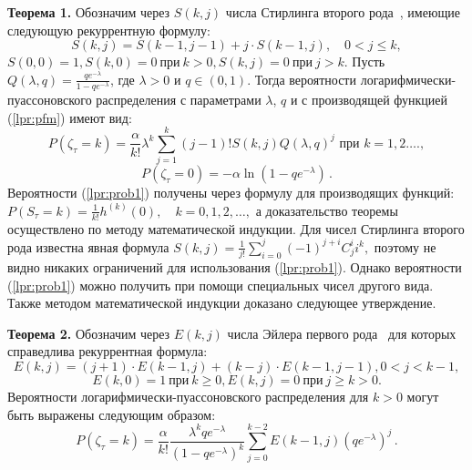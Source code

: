 \documentclass{math-mech-sci}
\begin{document}
	
	\textbf{Теорема 1.}
%		
Обозначим через $S(k, j)$ числа Стирлинга второго рода~\cite{bib:knuth1998}, имеющие следующую рекуррентную формулу:
\[
S(k, j) = S(k - 1, j - 1) + j \cdot S(k - 1, j), \quad 0 < j \leqslant k,
\]
$
S(0, 0) = 1, S(k, 0) = 0~ \text{при}~ k > 0, S(k, j) = 0~ \text{при}~ j > k.
$
		Пусть  $Q(\lambda,q)=\frac {q e ^{-\lambda}} {1 - q e ^{-\lambda}}$, где  $\lambda > 0$ и $q \in (0, 1)$.   Тогда вероятности логарифмически-пуассоновского распределения с параметрами $\lambda$,  $q $  и с  производящей функцией (\ref{lpr:pfm}) имеют вид:
		\begin{equation}\label{lpr:prob1}
			P(\zeta _\tau = k) = \frac \alpha {k !} \lambda ^k \sum \limits _{j = 1} ^{k} (j - 1)! S(k, j) Q(\lambda,q)^j \mbox{  при } k = 1, 2 \dots.,
		\end{equation}
	\[
	P(\zeta_\tau = 0) = -\alpha \ln\left(1 - q e ^{-\lambda}\right)\,.
	\]
			Вероятности (\ref{lpr:prob1}) получены через формулу для производящих функций:
	$ 
	P(S _\tau = k) = \frac {1} {k!} h ^{(k)} (0), \quad k = 0, 1, 2, \dots, 
$
	а доказательство теоремы осуществлено по методу математической индукции.
%	
%	
Для чисел Стирлинга второго рода  известна явная формула
$
	S(k, j) = \frac {1} {j!} \sum \limits _{i = 0} ^j (-1) ^{j + i} C _{j} ^{i} i ^k, 
$
	поэтому не видно  никаких ограничений для использования (\ref{lpr:prob1}). Однако вероятности 
	(\ref{lpr:prob1})  можно получить при помощи  специальных чисел  другого вида. Также методом математической индукции
		доказано следующее утверждение. 

	\textbf{Теорема 2.}
	Обозначим через  $E(k, j)$  числа Эйлера первого рода~\cite{bib:knuth1998} для которых справедлива  рекуррентная формула:
	\[
	E(k, j) = (j + 1) \cdot E(k - 1, j) + (k - j) \cdot E(k - 1, j - 1), 0 < j < k - 1,
	\]
	\[
	E(k, 0) = 1~ \text{при}~ k \geqslant 0, E(k, j) = 0~ \text{при}~ j \geqslant k > 0.
	\]
%
		Вероятности логарифмически-пуассоновского распределения для $k>0$ могут быть выражены следующим образом:
			\begin{equation}\label{lpr:prob2}
				P( \zeta _\tau = k) = \frac \alpha {k !} \frac {\lambda ^k q e ^{-\lambda}} {\left(1 - q e ^{-\lambda}\right) ^k} \sum \limits _{j = 0} ^{k - 2} E(k - 1, j) \left(q e ^{-\lambda}\right) ^j\,.
			\end{equation}
			
\end{document}
